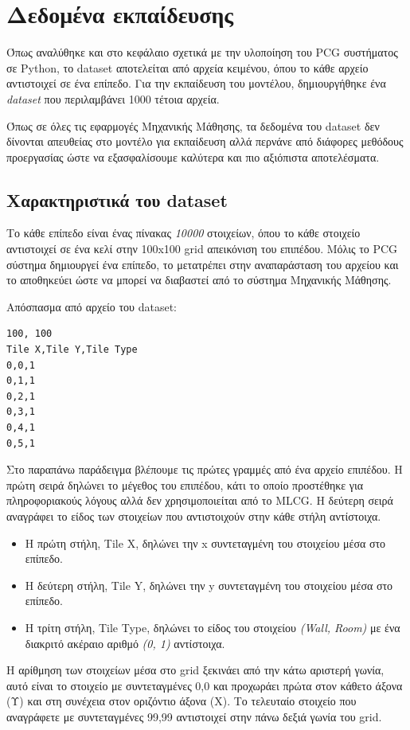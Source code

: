 \section{Δεδομένα εκπαίδευσης}
Όπως αναλύθηκε και στο κεφάλαιο σχετικά με την υλοποίηση του PCG συστήματος σε Python, το dataset αποτελείται από αρχεία κειμένου, όπου το κάθε αρχείο αντιστοιχεί σε ένα επίπεδο. Για την εκπαίδευση του μοντέλου, δημιουργήθηκε ένα \textit{dataset} που περιλαμβάνει 1000 τέτοια αρχεία.
\par
Όπως σε όλες τις εφαρμογές Μηχανικής Μάθησης, τα δεδομένα του dataset δεν δίνονται απευθείας στο μοντέλο για εκπαίδευση αλλά περνάνε από διάφορες μεθόδους προεργασίας ώστε να εξασφαλίσουμε καλύτερα και πιο αξιόπιστα αποτελέσματα.


\subsection{Χαρακτηριστικά του dataset}
Το κάθε επίπεδο είναι ένας πίνακας \textit{10000} στοιχείων, όπου το κάθε στοιχείο αντιστοιχεί σε ένα κελί στην 100x100 grid απεικόνιση του επιπέδου. Μόλις το PCG σύστημα δημιουργεί ένα επίπεδο, το μετατρέπει στην αναπαράσταση του αρχείου και το αποθηκεύει ώστε να μπορεί να διαβαστεί από το σύστημα Μηχανικής Μάθησης.
\par
Απόσπασμα από αρχείο του dataset:
\begin{verbatim}
100, 100
Tile X,Tile Y,Tile Type
0,0,1
0,1,1
0,2,1
0,3,1
0,4,1
0,5,1
\end{verbatim}
Στο παραπάνω παράδειγμα βλέπουμε τις πρώτες γραμμές από ένα αρχείο επιπέδου. Η πρώτη σειρά δηλώνει το μέγεθος του επιπέδου, κάτι το οποίο προστέθηκε για πληροφοριακούς λόγους αλλά δεν χρησιμοποιείται από το MLCG. Η δεύτερη σειρά αναγράφει το είδος των στοιχείων που αντιστοιχούν στην κάθε στήλη αντίστοιχα.
\par

\begin{itemize}
\item Η πρώτη στήλη, Tile X, δηλώνει την x συντεταγμένη του στοιχείου μέσα στο επίπεδο.
\item Η δεύτερη στήλη, Tile Y, δηλώνει την y συντεταγμένη του στοιχείου μέσα στο επίπεδο.
\item Η τρίτη στήλη, Tile Type, δηλώνει το είδος του στοιχείου \textit{(Wall, Room)} με ένα διακριτό ακέραιο αριθμό \textit{(0, 1)} αντίστοιχα.
\end{itemize}

\par
H αρίθμηση των στοιχείων μέσα στο grid ξεκινάει από την κάτω αριστερή γωνία, αυτό είναι το στοιχείο με συντεταγμένες 0,0 και προχωράει πρώτα στον κάθετο άξονα (Υ) και στη συνέχεια στον οριζόντιο άξονα (Χ). Το τελευταίο στοιχείο που αναγράφετε με συντεταγμένες 99,99 αντιστοιχεί στην πάνω δεξιά γωνία του grid.

